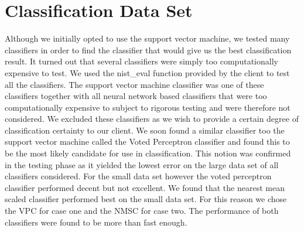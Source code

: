 \documentclass[%
        compressed,
        final,
        notitlepage,
        narroweqnarray,
        inline,
        twoside,
        ]{ieee}
\begin{document}
\section{Classification Data Set}
Although we initially opted to use the support vector machine, we tested many
classifiers in order to find the classifier that would give us the best
classification result. It turned out that several classifiers were simply too
computationally expensive to test. We used the nist\_eval function provided
by the client to test all the classifiers. The support vector machine classifier
was one of these classifiers together with all neural network based classifiers
that were too computationally expensive to subject to rigorous testing and were
therefore not considered. We excluded these classifiers as we wish to provide a
certain degree of classification certainty to our client. We soon found a
similar classifier too the support vector machine called the Voted Perceptron classifier and found this to be
the most likely candidate for use in classification. This notion was confirmed in the testing phase as it
yielded the lowest error on the large data set of all classifiers considered.
For the small data set however the voted perceptron classifier performed decent
but not excellent. We found that the nearest mean scaled classifier performed
best on the small data set. For this reason we chose the VPC for case one and
the NMSC for case two. The performance of both classifiers were found to be more
than fast enough.
\end{document}
